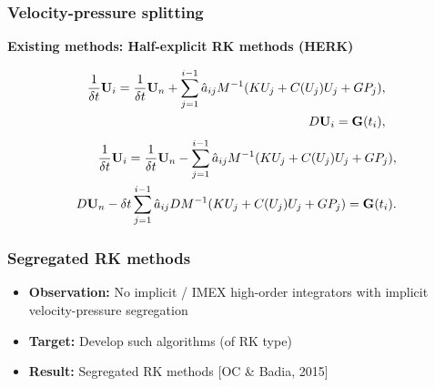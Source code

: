\begin{frame}
\frametitle{Velocity-pressure splitting}
\textbf{Existing methods: Half-explicit RK methods (HERK)}
\vspace{-0.5cm}
\begin{overprint}
\begin{align*}
\frac{1}{\delta t}{\bf U}_i=\frac{1}{\delta t}{\bf U}_n + \sum_{j=1}^{i-1}\hat{a}_{ij} M^{-1} (K U_j + C(U_j) U_j + G P_j), \\
 D {\bf U}_i = \mathbf{G}(t_i),
\end{align*}
\begin{align*}
\frac{1}{\delta t}{\bf U}_i=\frac{1}{\delta t}{\bf U}_n - \sum_{j=1}^{i-1}\hat{a}_{ij} M^{-1} (K U_j + C(U_j) U_j + G P_j), \\
D {\bf U}_n - \delta t \sum_{j=1}^{i-1}\hat{a}_{ij} DM^{-1}(K U_j + C(U_j) U_j + G P_j) = \mathbf{G}(t_i).
\end{align*}
\end{overprint}
\vspace{0.3cm}
\end{frame}
\begin{frame}
\frametitle{Segregated RK methods}
\vfill
\begin{itemize}
\item<1-> \textbf{Observation:} No implicit / IMEX high-order integrators with implicit velocity-pressure segregation
\item<2-> \textbf{Target:} Develop such algorithms (of RK type)
\item<3-> \textbf{Result:} Segregated RK methods [OC \& Badia, 2015]
\end{itemize}
\vfill
\end{frame}
